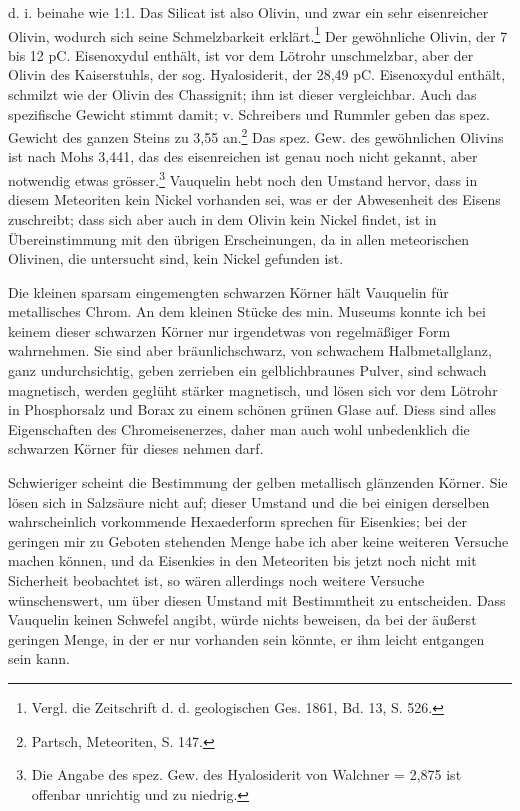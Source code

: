 \documentclass[a4paper, 11pt, oneside]{article}
\begin{document}
d. i. beinahe wie 1:1. Das Silicat ist also Olivin, und zwar ein sehr eisenreicher Olivin, wodurch sich seine Schmelzbarkeit erklärt.\footnote{Vergl. die Zeitschrift d. d. geologischen Ges. 1861, Bd. 13, S. 526.} Der gewöhnliche Olivin, der 7 bis 12 pC. Eisenoxydul enthält, ist vor dem Lötrohr unschmelzbar, aber der Olivin des Kaiserstuhls, der sog. Hyalosiderit, der 28,49 pC. Eisenoxydul enthält, schmilzt wie der Olivin des Chassignit; ihm ist dieser vergleichbar. Auch das spezifische Gewicht stimmt damit; v. Schreibers und Rummler geben das spez. Gewicht des ganzen Steins zu 3,55 an.\footnote{Partsch, Meteoriten, S. 147.} Das spez. Gew. des gewöhnlichen Olivins ist nach Mohs 3,441, das des eisenreichen ist genau noch nicht gekannt, aber notwendig etwas grösser.\footnote{Die Angabe des spez. Gew. des Hyalosiderit von Walchner = 2,875 ist offenbar unrichtig und zu niedrig.} Vauquelin hebt noch den Umstand hervor, dass in diesem Meteoriten kein Nickel vorhanden sei, was er der Abwesenheit des Eisens zuschreibt; dass sich aber auch in dem Olivin kein Nickel findet, ist in Übereinstimmung mit den übrigen Erscheinungen, da in allen meteorischen Olivinen, die untersucht sind, kein Nickel gefunden ist.

Die kleinen sparsam eingemengten schwarzen Körner hält Vauquelin für metallisches Chrom. An dem kleinen Stücke des min. Museums konnte ich bei keinem dieser schwarzen Körner nur irgendetwas von regelmäßiger Form wahrnehmen. Sie sind aber bräunlichschwarz, von schwachem Halbmetallglanz, ganz undurchsichtig, geben zerrieben ein gelblichbraunes Pulver, sind schwach magnetisch, werden geglüht stärker magnetisch, und lösen sich vor dem Lötrohr in Phosphorsalz und Borax zu einem schönen grünen Glase auf. Diess sind alles Eigenschaften des Chromeisenerzes, daher man auch wohl unbedenklich die schwarzen Körner für dieses nehmen darf.

Schwieriger scheint die Bestimmung der gelben metallisch glänzenden Körner. Sie lösen sich in Salzsäure nicht auf; dieser Umstand und die bei einigen derselben wahrscheinlich vorkommende Hexaederform sprechen für Eisenkies; bei der geringen mir zu Geboten stehenden Menge habe ich aber keine weiteren Versuche machen können, und da Eisenkies in den Meteoriten bis jetzt noch nicht mit Sicherheit beobachtet ist, so wären allerdings noch weitere Versuche wünschenswert, um über diesen Umstand mit Bestimmtheit zu entscheiden. Dass Vauquelin keinen Schwefel angibt, würde nichts beweisen, da bei der äußerst geringen Menge, in der er nur vorhanden sein könnte, er ihm leicht entgangen sein kann.
\end{document}
